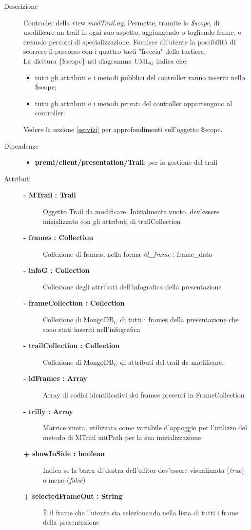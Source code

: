 \begin{description}
\item[Descrizione] \hfill
	Controller della view \textit{modTrail.ng}. Permette, tramite lo \textit{\$scope}, di modificare un trail in ogni suo aspetto, aggiungendo o togliendo frame, o creando percorsi di specializzazione. Fornisce all'utente la possibilità di scorrere il percorso con i quattro tasti "freccia" della tastiera.
	\\ La dicitura \{\$scope\} nel diagramma UML$_G$ indica che:
\begin{itemize}
\item tutti gli attributi e i metodi pubblici del controller vanno inseriti nello \$scope;
\item tutti gli attributi e i metodi privati del controller appartengono al controller.
\end{itemize}
Vedere la sezione \ref{servizi} per approfondimenti sull'oggetto \$scope.
	
	
\item[Dipendenze] \hfill
	\begin{itemize}
		\item \textbf{premi/client/presentation/Trail}: per la gestione del trail
	\end{itemize}
	
	
\item[Attributi] \hfill
	\begin{description}
		\item[\textbf{- MTrail : Trail			}] \hfill
			Oggetto Trail da modificare. Inizialmente vuoto, dev'essere inizializzato con gli attributi di trailCollection
		\item[\textbf{- frames : Collection			}] \hfill
			Collezione di frames, nella forma \textit{id\_frame} : frame\_data
		\item[\textbf{- infoG : Collection			}] \hfill
			Collezione degli attributi dell'infografica della presentazione
		\item[\textbf{- frameCollection : Collection			}] \hfill
			Collezione di MongoDB$_G$ di tutti i frames della presentazione che sono stati inseriti nell'infografica
		\item[\textbf{- trailCollection : Collection			}] \hfill
			Collezione di MongoDB$_G$ di attributi del trail da modificare.
		\item[\textbf{- idFrames : Array			}] \hfill
			Array di codici identificativi dei frames presenti in FrameCollection
		\item[\textbf{- trilly : Array			}] \hfill
			Matrice vuota, utilizzata come variabile d'appoggio per l'utilizzo del metodo di MTrail initPath per la sua inizializzazione
		\item[\textbf{+ showInSide : boolean			}] \hfill
			Indica se la barra di destra dell'editor dev'essere visualizzata (\textit{true}) o meno (\textit{false})
		\item[\textbf{+ selectedFrameOut : String			}] \hfill
			È il frame che l'utente sta selezionando nella lista di tutti i frame della presentazione
	\end{description}
	

\end{description}
